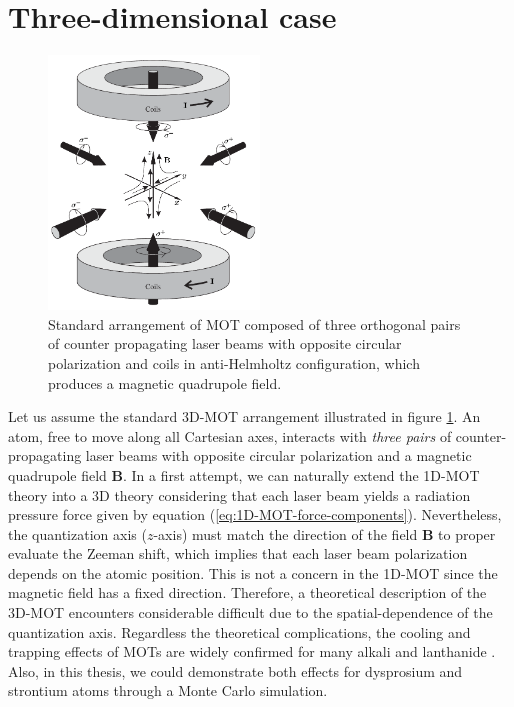 %
\section{Three-dimensional case}
\label{sec:three-dimensional-MOT}
%
\begin{figure}[!ht]
	\centering
	\includegraphics[width=0.5\textwidth]{USPSC-img/standard-3D-MOT-arrangement.png}
	\caption{Standard arrangement of MOT composed of three orthogonal pairs of counter propagating laser beams with opposite circular polarization and coils in anti-Helmholtz configuration, which produces a magnetic quadrupole field.}
	\label{fig:standard-3D-MOT-arrangement}
\end{figure}

Let us assume the standard 3D-MOT arrangement illustrated in figure \ref{fig:standard-3D-MOT-arrangement}. An atom, free to move along all Cartesian axes, interacts with \textit{three pairs} of counter-propagating laser beams with opposite circular polarization and a magnetic quadrupole field $ \mathbf{B} $. In a first attempt, we can naturally extend the 1D-MOT theory into a 3D theory considering that each laser beam yields a radiation pressure force given by equation (\ref{eq:1D-MOT-force-components}). Nevertheless, the quantization axis ($z$-axis) must match the direction of the field $ \mathbf{B} $ to proper evaluate the Zeeman shift, which implies that each laser beam polarization depends on the atomic position. This is not a concern in the 1D-MOT since the magnetic field has a fixed direction. Therefore, a theoretical description of the 3D-MOT \cite{prudnikov2015three} encounters considerable difficult due to the spatial-dependence of the quantization axis. Regardless the theoretical complications, the cooling and trapping effects of MOTs are widely confirmed for many alkali \cite{raab1987trapping, katori1999magneto, zachorowski1998magneto} and lanthanide \cite{maier2014narrow, miyazawa2021narrow, frisch2012narrow}. Also, in this thesis, we could demonstrate both effects for dysprosium and strontium atoms through a Monte Carlo simulation.

